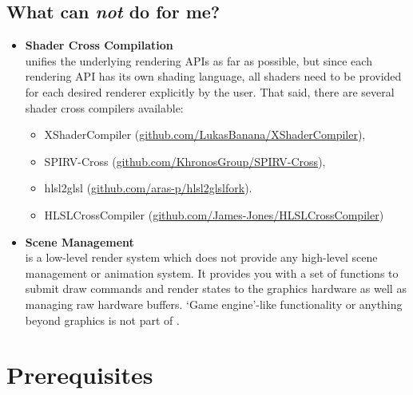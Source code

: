\documentclass{article}
\begin{document}
\subsection{What can \LLGL \emph{not} do for me?}

\begin{itemize}
	\item \textbf{Shader Cross Compilation} \\
	\LLGL unifies the underlying rendering APIs as far as possible, but since each rendering API has its own shading language,
	all shaders need to be provided for each desired renderer explicitly by the user.
	That said, there are several shader cross compilers available:
	\begin{itemize}
	\item XShaderCompiler (\href{https://github.com/LukasBanana/XShaderCompiler}{github.com/LukasBanana/XShaderCompiler}),
	\item SPIRV-Cross (\href{https://github.com/KhronosGroup/SPIRV-Cross}{github.com/KhronosGroup/SPIRV-Cross}),
	\item hlsl2glsl (\href{https://github.com/aras-p/hlsl2glslfork}{github.com/aras-p/hlsl2glslfork}).
	\item HLSLCrossCompiler (\href{https://github.com/James-Jones/HLSLCrossCompiler}{github.com/James-Jones/HLSLCrossCompiler})
	\end{itemize}
	
	\item \textbf{Scene Management} \\
	\LLGL is a low-level render system which does not provide any high-level scene management or animation system.
	It provides you with a set of functions to submit draw commands and render states to the graphics hardware as well as managing raw hardware buffers.
	`Game engine'-like functionality or anything beyond graphics is not part of \LLGL.
\end{itemize}



\newpage
\section{Prerequisites}
\end{document}
